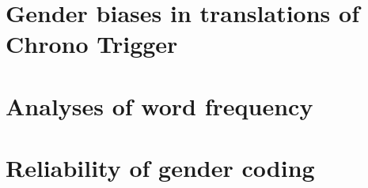 \documentclass[12pt,a4paper]{article}
\newcommand{\includepdfPlus}[1]{}
\begin{document}
\clearpage
\newpage
\section{Gender biases in translations of Chrono Trigger}

\includepdfPlus{../../analysis/Appendices/Analyse_ChronoTriggerTranslations.pdf}

\clearpage
\newpage
\section{Analyses of word frequency}
\includepdfPlus{../../analysis/Analyse_Frequency.pdf}

\clearpage
\newpage
\section{Reliability of gender coding}
\includepdfPlus{../../analysis/reliability/Reliability.pdf}
\end{document}

